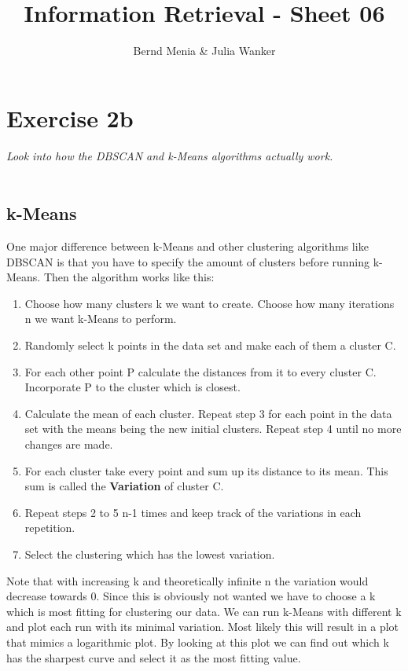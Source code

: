 \documentclass{article}
\author{Bernd Menia \& Julia Wanker}
\title{Information Retrieval - Sheet 06}
\begin{document}
	
\maketitle

\section{Exercise 2b}
\textit{Look into how the DBSCAN and k-Means algorithms actually work.}\\
\\
\subsection{k-Means}
One major difference between k-Means and other clustering algorithms like DBSCAN is that you have to specify the amount of clusters before running k-Means. Then the algorithm works like this:  

\begin{enumerate}
	\item Choose how many clusters k we want to create. Choose how many iterations n we want k-Means to perform. 
	
	\item Randomly select k points in the data set and make each of them a cluster C. 
	
	\item For each other point P calculate the distances from it to every cluster C. Incorporate P to the cluster which is closest. 
	
	\item Calculate the mean of each cluster. Repeat step 3 for each point in the data set with the means being the new initial clusters. Repeat step 4 until no more changes are made. 
	
	\item For each cluster take every point and sum up its distance to its mean. This sum is called the \textbf{Variation} of cluster C. 
	
	\item Repeat steps 2 to 5 n-1 times and keep track of the variations in each repetition. 
	
	\item Select the clustering which has the lowest variation. 
\end{enumerate}	

Note that with increasing k and theoretically infinite n the variation would decrease towards 0. Since this is obviously not wanted we have to choose a k which is most fitting for clustering our data. We can run k-Means with different k and plot each run with its minimal variation. Most likely this will result in a plot that mimics a logarithmic plot. By looking at this plot we can find out which k has the sharpest curve and select it as the most fitting value. 
\end{document}

